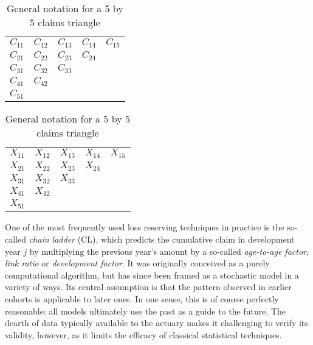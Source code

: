 \documentclass[a4paper]{book}
\begin{document}
\begin{table}
  \centering
  \begin{subtable}{0.45\textwidth}
    \centering
    \large
    \begin{tabular}{c c c c c}
      $C_{11}$ & $C_{12}$ & $C_{13}$ & $C_{14}$ & $C_{15}$ \\
      $C_{21}$ & $C_{22}$ & $C_{23}$ & $C_{24}$ &          \\
      $C_{31}$ & $C_{32}$ & $C_{33}$ &          &          \\
      $C_{41}$ & $C_{42}$ &          &          &          \\
      $C_{51}$ &          &          &          &
    \end{tabular}
  \end{subtable}
  \hfill
  \begin{subtable}{0.45\textwidth}
    \centering
    \large
    \begin{tabular}{c c c c c}
      $X_{11}$ & $X_{12}$ & $X_{13}$ & $X_{14}$ & $X_{15}$ \\
      $X_{21}$ & $X_{22}$ & $X_{23}$ & $X_{24}$ &          \\
      $X_{31}$ & $X_{32}$ & $X_{33}$ &          &          \\
      $X_{41}$ & $X_{42}$ &          &          &          \\
      $X_{51}$ &          &          &          &
    \end{tabular}
  \end{subtable}
  \caption{General notation for a 5 by 5 claims triangle}
\end{table}

One of the most frequently used loss reserving techniques in practice is the so-called \emph{chain ladder} (CL), which predicts the cumulative claim in development year $j$ by multiplying the previous year's amount by a so-called \emph{age-to-age factor}, \emph{link ratio} or \emph{development factor}. It was originally conceived as a purely computational algorithm, but has since been framed as a stochastic model in a variety of ways. Its central assumption is that the pattern observed in earlier cohorts is applicable to later ones. In one sense, this is of course perfectly reasonable: all models ultimately use the past as a guide to the future. The dearth of data typically available to the actuary makes it challenging to verify its validity, however, as it limits the efficacy of classical statistical techniques.
\end{document}
